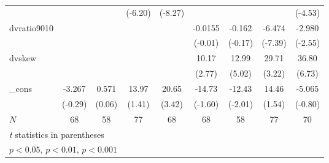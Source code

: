 {\begin{tabular}{l*{8}{c}}
            &                     &                     &     (-6.20)         &     (-8.27)         &                     &                     &                     &     (-4.53)         \\
[1em]
dvratio9010 &                     &                     &                     &                     &     -0.0155         &      -0.162         &      -6.474\sym{***}&      -2.980\sym{*}  \\
            &                     &                     &                     &                     &     (-0.01)         &     (-0.17)         &     (-7.39)         &     (-2.55)         \\
[1em]
dvskew      &                     &                     &                     &                     &       10.17\sym{**} &       12.99\sym{***}&       29.71\sym{**} &       36.80\sym{***}\\
            &                     &                     &                     &                     &      (2.77)         &      (5.02)         &      (3.22)         &      (6.73)         \\
[1em]
\_cons      &      -3.267         &       0.571         &       13.97         &       20.65\sym{***}&      -14.73         &      -12.43\sym{*}  &       14.46         &      -5.065         \\
            &     (-0.29)         &      (0.06)         &      (1.41)         &      (3.42)         &     (-1.60)         &     (-2.01)         &      (1.54)         &     (-0.80)         \\
\hline
\(N\)       &          68         &          58         &          77         &          68         &          68         &          58         &          77         &          70         \\
\hline\hline
\multicolumn{9}{l}{\footnotesize \textit{t} statistics in parentheses}\\
\multicolumn{9}{l}{\footnotesize \sym{*} \(p<0.05\), \sym{**} \(p<0.01\), \sym{***} \(p<0.001\)}\\
\end{tabular}
}
